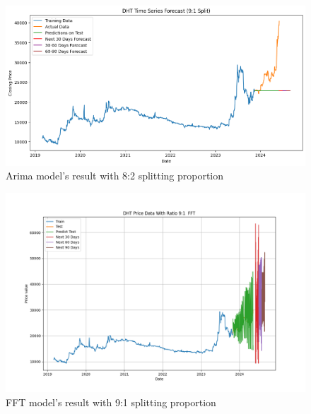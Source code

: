 \documentclass{ieeeojies}
\begin{document}
\vspace{-1em}

\begin{figure}[H]
  \centering
  \begin{minipage}{0.8\linewidth}
    \centering
    \includegraphics[width=\linewidth]{bibliography/Figure/DHT_ARIMA.png}
    \caption{Arima model's result with 8:2 splitting proportion}
    \label{fig8}
  \end{minipage}
\end{figure}

\vspace{-1em}

\begin{figure}[H]
  \centering
  \begin{minipage}{0.8\linewidth}
    \centering
    \includegraphics[width=\linewidth]{bibliography/Figure/FFT_91_DHT.png}
    \caption{FFT model's result with 9:1 splitting proportion}
    \label{fig8}
  \end{minipage}
\end{figure}
\end{document}
